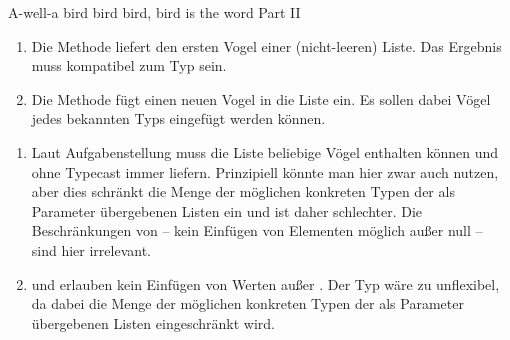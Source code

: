 \documentclass{../tuda-exercise}
\begin{document}
\begin{task}[credit=\stars{2}{3}]{A-well-a bird bird bird, bird is the word Part II}
    \begin{enumerate}
      [label=(\arabic*):]
      \item Die Methode  liefert den ersten Vogel
      einer (nicht-leeren) Liste. Das Ergebnis muss kompatibel zum Typ  sein.
      
      \item Die Methode  fügt einen neuen
      Vogel in die Liste ein. Es sollen dabei Vögel jedes bekannten Typs eingefügt werden können.

      
    \end{enumerate}

    \clearpagesolution

    \begin{solution}
      \begin{enumerate}
        [label=(\arabic*):]
        \item Laut Aufgabenstellung muss die Liste beliebige Vögel enthalten können und ohne
        Typecast immer  liefern. Prinzipiell könnte man hier zwar auch
         nutzen, aber dies schränkt die Menge der möglichen konkreten
        Typen der als Parameter übergebenen Listen ein und ist daher schlechter. Die
        Beschränkungen von  – kein Einfügen von Elementen
        möglich außer null – sind hier irrelevant.

        

        \item {} und  erlauben kein Einfügen
        von Werten außer . Der Typ  wäre zu unflexibel,
        da dabei die Menge der möglichen konkreten Typen der als Parameter übergebenen Listen
        eingeschränkt wird.

        
      \end{enumerate}
    \end{solution}
  \end{task}

  \clearpage
\end{document}
